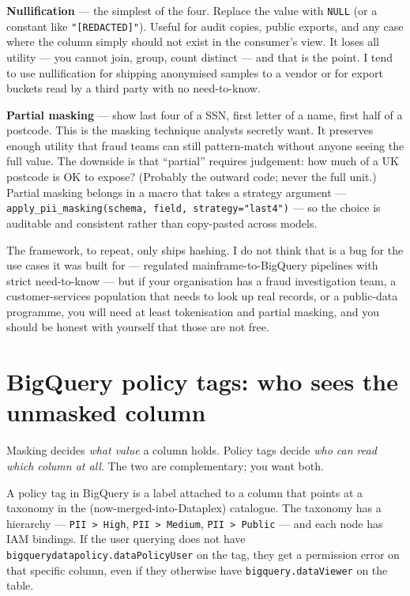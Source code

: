 \documentclass[
  11pt,
  british,
  oneside]{book}
\begin{document}
\textbf{Nullification} --- the simplest of the four. Replace the value
with \texttt{NULL} (or a constant like \texttt{"{[}REDACTED{]}"}).
Useful for audit copies, public exports, and any case where the column
simply should not exist in the consumer's view. It loses all utility ---
you cannot join, group, count distinct --- and that is the point. I tend
to use nullification for shipping anonymised samples to a vendor or for
export buckets read by a third party with no need-to-know.

\textbf{Partial masking} --- show last four of a SSN, first letter of a
name, first half of a postcode. This is the masking technique analysts
secretly want. It preserves enough utility that fraud teams can still
pattern-match without anyone seeing the full value. The downside is that
``partial'' requires judgement: how much of a UK postcode is OK to
expose? (Probably the outward code; never the full unit.) Partial
masking belongs in a macro that takes a strategy argument ---
\texttt{apply\_pii\_masking(schema,\ field,\ strategy="last4")} --- so
the choice is auditable and consistent rather than copy-pasted across
models.

The framework, to repeat, only ships hashing. I do not think that is a
bug for the use cases it was built for --- regulated
mainframe-to-BigQuery pipelines with strict need-to-know --- but if your
organisation has a fraud investigation team, a customer-services
population that needs to look up real records, or a public-data
programme, you will need at least tokenisation and partial masking, and
you should be honest with yourself that those are not free.

\hypertarget{bigquery-policy-tags-who-sees-the-unmasked-column}{%
\section{BigQuery policy tags: who sees the unmasked
column}\label{bigquery-policy-tags-who-sees-the-unmasked-column}}

Masking decides \emph{what value} a column holds. Policy tags decide
\emph{who can read which column at all}. The two are complementary; you
want both.

A policy tag in BigQuery is a label attached to a column that points at
a taxonomy in the (now-merged-into-Dataplex) catalogue. The taxonomy has
a hierarchy --- \texttt{PII\ \textgreater{}\ High},
\texttt{PII\ \textgreater{}\ Medium},
\texttt{PII\ \textgreater{}\ Public} --- and each node has IAM bindings.
If the user querying does not have
\texttt{bigquerydatapolicy.dataPolicyUser} on the tag, they get a
permission error on that specific column, even if they otherwise have
\texttt{bigquery.dataViewer} on the table.
\end{document}
